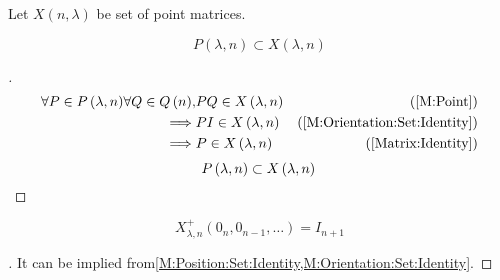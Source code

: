 \documentclass[../main.tex]{subfiles}
\begin{document}
\begin{definition}\label{M:Point:Set}
Let \(X\left(n,\lambda\right)\) be set of point matrices.
\end{definition}
\begin{corollary}\label{M:Point:Position}
\[
P\left(\lambda,n\right)\subset X\left(\lambda,n\right)
\]
\end{corollary}
\begin{proof}[]
\begin{align*}
\forall{P\in P\left(\lambda,n\right)}
\forall{Q\in Q\left(n\right)},
&P Q\in X\left(\lambda,n\right)
&\text{(\cref{M:Point})}\\
\implies
&P I\in X\left(\lambda,n\right)
&\text{(\cref{M:Orientation:Set:Identity})}\\
\implies
&P\in X\left(\lambda,n\right)
&\text{(\cref{Matrix:Identity})}
\end{align*}
\[
P\left(\lambda,n\right)\subset X\left(\lambda,n\right)\qedhere
\]
\end{proof}
\begin{corollary}\label{M:Point:Set:Identity}
\[
X^{+}_{\lambda,n}
\left(0_{n}, 0_{n-1},\dots\right)
=
I_{n+1}
\]
\end{corollary}
\begin{proof}[]
It can be implied from\cref{M:Position:Set:Identity,M:Orientation:Set:Identity}.
\end{proof}
\end{document}
